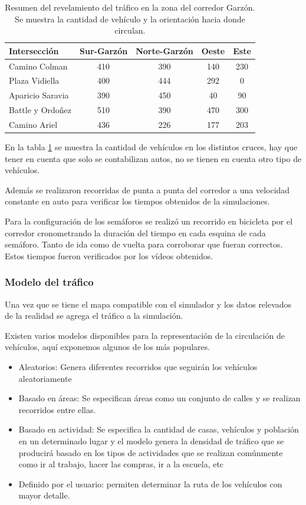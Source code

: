\begin{table}[H]
	\renewcommand{\arraystretch}{1.2}
	\caption{Resumen del revelamiento del tráfico en la zona del corredor Garzón. Se muestra la cantidad de vehículo y la orientación hacia donde circulan.}
	\label{table:resumen_trafico}
	\centering
	\begin{tabular}{lcccc}
		\hline
		Intersección&
		Sur-Garzón& 
		Norte-Garzón & 
		Oeste &
		Este 
		\\ 
		\hline
		Camino Colman  & 410 & 390 & 140 & 230\\		
		Plaza Vidiella  & 400 & 444 & 292 & 0\\		
		Aparicio Saravia  & 390 & 450 & 40 & 90\\		
		Battle y Ordoñez  & 510 & 390 & 470 & 300 \\	
		Camino Ariel  & 436 & 226 & 177 & 203 \\													
		\hline
		
		
		\hline
	\end{tabular}
\end{table}

En la tabla \ref{table:resumen_trafico} se muestra la cantidad de vehículos en los distintos cruces, hay que tener en cuenta que solo se contabilizan autos, no se tienen en cuenta otro tipo de vehículos.

Además se realizaron recorridas de punta a punta del corredor a una velocidad constante en auto para verificar los tiempos obtenidos de la simulaciones.

Para la configuración de los semáforos se realizó un recorrido en bicicleta por el corredor cronometrando la duración del tiempo en cada esquina de cada semáforo. Tanto de ida como de vuelta para corroborar que fueran correctos. Estos tiempos fueron verificados por los vídeos obtenidos.



\subsubsection{Modelo del tráfico}
Una vez que se tiene el mapa compatible con el simulador y los datos relevados de la realidad se agrega el tráfico a la simulación.

Existen varios modelos disponibles para la representación de la circulación de vehículos, aquí exponemos algunos de los más populares. 
\begin{itemize}
	\item Aleatorios: Genera diferentes recorridos que seguirán los vehículos aleatoriamente
	\item Basado en áreas:  Se especifican áreas como un conjunto de calles y se realizan recorridos entre ellas.
	\item Basado en actividad: Se especifica la cantidad de casas, vehículos y población en un determinado lugar y el modelo genera la densidad de tráfico que se producirá basado en los tipos de actividades que se realizan comúnmente como ir al trabajo, hacer las compras, ir a la escuela,  etc
	\item Definido por el usuario: permiten determinar la ruta de los vehículos con mayor detalle.
\end{itemize}


